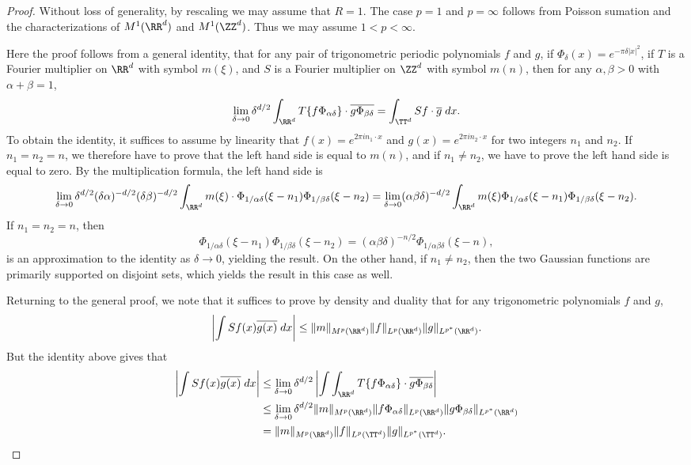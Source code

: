 \begin{proof}
    Without loss of generality, by rescaling we may assume that $R = 1$. The case $p = 1$ and $p = \infty$ follows from Poisson sumation and the characterizations of $M^1(\RR^d)$ and $M^1(\ZZ^d)$. Thus we may assume $1 < p < \infty$. 

    Here the proof follows from a general identity, that for any pair of trigonometric periodic polynomials $f$ and $g$, if $\Phi_\delta(x) = e^{- \pi \delta |x|^2}$, if $T$ is a Fourier multiplier on $\RR^d$ with symbol $m(\xi)$, and $S$ is a Fourier multiplier on $\ZZ^d$ with symbol $m(n)$, then for any $\alpha,\beta > 0$ with $\alpha + \beta = 1$,
    \[ \lim_{\delta \to 0} \delta^{d/2} \int_{\RR^d} T \{ f \Phi_{\alpha \delta} \} \cdot \overline{ g \Phi_{\beta \delta} } = \int_{\TT^d} Sf \cdot \overline{g}\; dx.  \]
    To obtain the identity, it suffices to assume by linearity that $f(x) = e^{2 \pi i n_1 \cdot x}$ and $g(x) = e^{2 \pi i n_2 \cdot x}$ for two integers $n_1$ and $n_2$. If $n_1 = n_2 = n$, we therefore have to prove that the left hand side is equal to $m(n)$, and if $n_1 \neq n_2$, we have to prove the left hand side is equal to zero. By the multiplication formula, the left hand side is
    \[ \lim_{\delta \to 0} \delta^{d/2} (\delta \alpha)^{-d/2} (\delta \beta)^{-d/2} \int_{\RR^d} m(\xi) \cdot \Phi_{1/\alpha \delta}(\xi - n_1) \Phi_{1/\beta \delta}(\xi - n_2) = \lim_{\delta \to 0} (\alpha \beta \delta)^{-d/2} \int_{\RR^d} m(\xi) \Phi_{1/\alpha \delta}(\xi - n_1) \Phi_{1/\beta \delta}(\xi - n_2). \]
    If $n_1 = n_2 = n$, then
    \[ \Phi_{1/\alpha \delta}(\xi - n_1) \Phi_{1/\beta \delta}(\xi - n_2) = (\alpha \beta \delta)^{-n/2} \Phi_{1/\alpha \beta \delta}(\xi - n), \]
    is an approximation to the identity as $\delta \to 0$, yielding the result. On the other hand, if $n_1 \neq n_2$, then the two Gaussian functions are primarily supported on disjoint sets, which yields the result in this case as well.

    Returning to the general proof, we note that it suffices to prove by density and duality that for any trigonometric polynomials $f$ and $g$, 
    \[ \left| \int Sf(x) \overline{g(x)}\; dx \right| \leq \| m \|_{M^p(\RR^d)} \| f \|_{L^p(\RR^d)} \| g \|_{L^{p^*}(\RR^d)}. \]
    But the identity above gives that
    \begin{align*}
        \left| \int Sf(x) \overline{g(x)}\; dx \right| &\leq \lim_{\delta \to 0} \delta^{d/2} \left| \int \int_{\RR^d} T \{ f \Phi_{\alpha \delta} \} \cdot \overline{ g \Phi_{\beta \delta}} \right|\\
        &\leq \lim_{\delta \to 0} \delta^{d/2} \| m \|_{M^p(\RR^d)} \| f \Phi_{\alpha \delta} \|_{L^p(\RR^d)} \| g \Phi_{\beta \delta} \|_{L^{p^*}(\RR^d)}\\
        &= \| m \|_{M^p(\RR^d)} \| f \|_{L^p(\TT^d)} \| g \|_{L^{p^*}(\TT^d)}. \qedhere
    \end{align*}
\end{proof}

